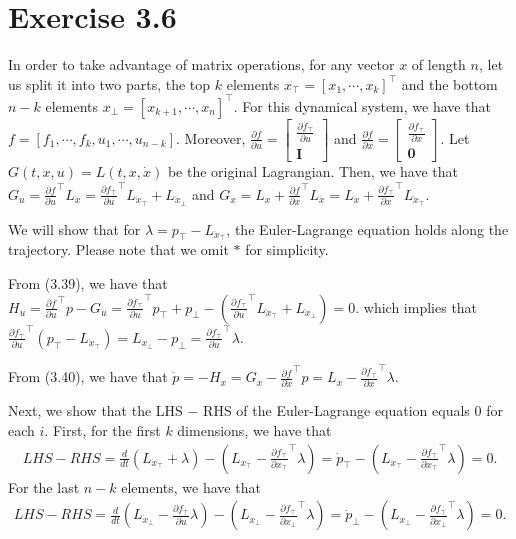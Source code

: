 \documentclass[11pt]{report}
\newcommand{\T}{\intercal}
\begin{document}
\section*{Exercise 3.6}
In order to take advantage of matrix operations, for any vector $x$ of length $n$, let us split it into two parts, the top $k$ elements $x_\top = [x_1, \cdots, x_k]^\T$ and the bottom $n-k$ elements $x_\bot = [x_{k+1}, \cdots, x_n]^\T$. For this dynamical system, we have that $f = [f_1, \cdots, f_k, u_1, \cdots, u_{n-k}]$. Moreover, $\frac{\partial f}{\partial u} = \begin{bmatrix}\frac{\partial f_\top}{\partial u}\\\mathbf{I}\end{bmatrix}$ and $\frac{\partial f}{\partial x} = \begin{bmatrix}\frac{\partial f_\top}{\partial x}\\\mathbf{0}\end{bmatrix}$. Let $G(t,x,u) = L(t,x,\dot{x})$ be the original Lagrangian. Then, we have that $G_u = \frac{\partial f}{\partial u}^\T L_{\dot{x}} = \frac{\partial f_\top}{\partial u}^\T L_{\dot{x}_\top} + L_{\dot{x}_\bot}$ and $G_x = L_x + \frac{\partial f}{\partial x}^\T L_{\dot{x}} = L_x + \frac{\partial f_\top}{\partial x}^\T L_{\dot{x}_\top} $.

We will show that for $\lambda = p_\top - L_{\dot{x}_\top}$, the Euler-Lagrange equation holds along the trajectory. Please note that we omit $*$ for simplicity.

From (3.39), we have that $H_u = \frac{\partial f}{\partial u}^\T p - G_u = \frac{\partial f_\top}{\partial u}^\T p_\top + p_\bot - \left(\frac{\partial f_\top}{\partial u}^\T L_{\dot{x}_\top} + L_{\dot{x}_\bot}\right) = 0$. which implies that $\frac{\partial f_\top}{\partial u}^\T(p_\top - L_{\dot{x}_\top}) = L_{\dot{x}_\bot} - p_\bot = \frac{\partial f_\top}{\partial u}^\T \lambda$.

From (3.40), we have that $\dot{p} = -H_x = G_x - \frac{\partial f}{\partial x}^\T p = L_x - \frac{\partial f_\top}{\partial x}^\T \lambda$.

Next, we show that the LHS $-$ RHS of the Euler-Lagrange equation equals $0$ for each $i$. First, for the first $k$ dimensions, we have that
\begin{multline*}
LHS-RHS = \frac{d}{dt}\left(L_{\dot{x}_\top} + \lambda\right) - \left(L_{x_\top} - \frac{\partial f_\top}{\partial x_\top}^\T\lambda\right) = \dot{p}_\top - \left(L_{x_\top} - \frac{\partial f_\top}{\partial x_\top}^\T \lambda\right) = 0.
\end{multline*}
For the last $n-k$ elements, we have that
\begin{multline*}
LHS-RHS = \frac{d}{dt}\left(L_{\dot{x}_\bot} - \frac{\partial f_\top}{\partial u} \lambda\right) - \left(L_{x_\bot} - \frac{\partial f_\top}{\partial x_\bot}^\T\lambda\right) = \dot{p}_\bot - \left(L_{x_\bot} - \frac{\partial f_\top}{\partial x_\bot}^\T\lambda\right) = 0.
\end{multline*}
\end{document}
